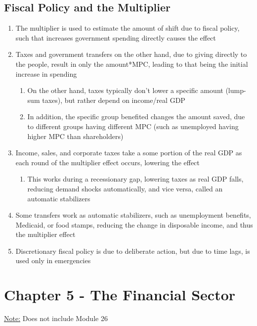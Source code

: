 \documentclass[11 pt, twoside]{article}
\begin{document}
\subsection{Fiscal Policy and the Multiplier}
\begin{enumerate}
\item The multiplier is used to estimate the amount of shift due to fiscal policy, such that increases government spending directly causes the effect
\item Taxes and government transfers on the other hand, due to giving directly to the people, result in only the amount*MPC, leading to that being the initial increase in spending
\begin{enumerate}
\item On the other hand, taxes typically don't lower a specific amount (lump-sum taxes), but rather depend on income/real GDP
\item In addition, the specific group benefited changes the amount saved, due to different groups having different MPC (such as unemployed having higher MPC than shareholders)
\end{enumerate}
\item Income, sales, and corporate taxes take a some portion of the real GDP as each round of the multiplier effect occurs, lowering the effect
\begin{enumerate}
\item This works during a recessionary gap, lowering taxes as real GDP falls, reducing demand shocks automatically, and vice versa, called an automatic stabilizers
\end{enumerate}
\item Some transfers work as automatic stabilizers, such as unemployment benefits, Medicaid, or food stamps, reducing the change in disposable income, and thus the multiplier effect
\item Discretionary fiscal policy is due to deliberate action, but due to time lags, is used only in emergencies
\end{enumerate}

\section{Chapter 5 - The Financial Sector}
\underline{Note:} Does not include Module 26
\end{document}
